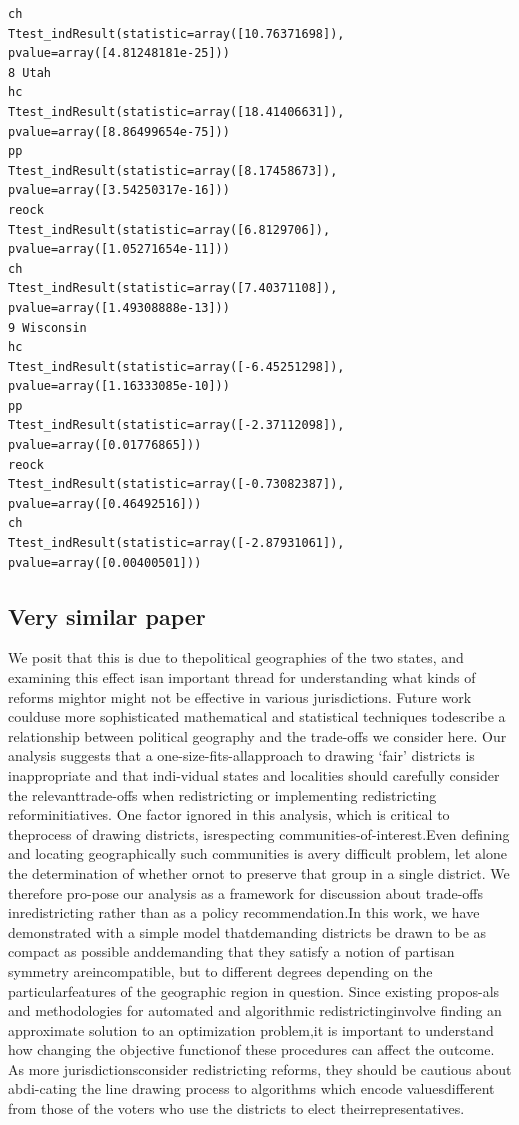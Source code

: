 \documentclass[]{article}
\begin{document}
\begin{verbatim}
ch
Ttest_indResult(statistic=array([10.76371698]), pvalue=array([4.81248181e-25]))
8 Utah
hc
Ttest_indResult(statistic=array([18.41406631]), pvalue=array([8.86499654e-75]))
pp
Ttest_indResult(statistic=array([8.17458673]), pvalue=array([3.54250317e-16]))
reock
Ttest_indResult(statistic=array([6.8129706]), pvalue=array([1.05271654e-11]))
ch
Ttest_indResult(statistic=array([7.40371108]), pvalue=array([1.49308888e-13]))
9 Wisconsin
hc
Ttest_indResult(statistic=array([-6.45251298]), pvalue=array([1.16333085e-10]))
pp
Ttest_indResult(statistic=array([-2.37112098]), pvalue=array([0.01776865]))
reock
Ttest_indResult(statistic=array([-0.73082387]), pvalue=array([0.46492516]))
ch
Ttest_indResult(statistic=array([-2.87931061]), pvalue=array([0.00400501]))
\end{verbatim}

\hypertarget{very-similar-paper}{%
\subsection{Very similar paper}\label{very-similar-paper}}

We posit that this is due to thepolitical geographies of the two states,
and examining this effect isan important thread for understanding what
kinds of reforms mightor might not be effective in various
jurisdictions. Future work coulduse more sophisticated mathematical and
statistical techniques todescribe a relationship between political
geography and the trade-offs we consider here. Our analysis suggests
that a one-size-fits-allapproach to drawing `fair' districts is
inappropriate and that indi-vidual states and localities should
carefully consider the relevanttrade-offs when redistricting or
implementing redistricting reforminitiatives. One factor ignored in this
analysis, which is critical to theprocess of drawing districts,
isrespecting communities-of-interest.Even defining and locating
geographically such communities is avery difficult problem, let alone
the determination of whether ornot to preserve that group in a single
district. We therefore pro-pose our analysis as a framework for
discussion about trade-offs inredistricting rather than as a policy
recommendation.In this work, we have demonstrated with a simple model
thatdemanding districts be drawn to be as compact as possible
anddemanding that they satisfy a notion of partisan symmetry
areincompatible, but to different degrees depending on the
particularfeatures of the geographic region in question. Since existing
propos-als and methodologies for automated and algorithmic
redistrictinginvolve finding an approximate solution to an optimization
problem,it is important to understand how changing the objective
functionof these procedures can affect the outcome. As more
jurisdictionsconsider redistricting reforms, they should be cautious
about abdi-cating the line drawing process to algorithms which encode
valuesdifferent from those of the voters who use the districts to elect
theirrepresentatives.


\end{document}
